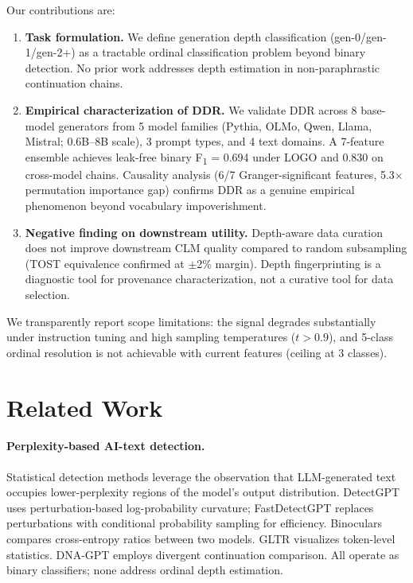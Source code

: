 \documentclass[11pt,a4paper]{article}
\newcommand{\fone}{F\textsubscript{1}}
\begin{document}
Our contributions are:
\begin{enumerate}[leftmargin=*,nosep]
\item \textbf{Task formulation.} We define generation depth classification (gen-0/gen-1/gen-2+) as a tractable ordinal classification problem beyond binary detection. No prior work addresses depth estimation in non-paraphrastic continuation chains.

\item \textbf{Empirical characterization of DDR.} We validate DDR across 8 base-model generators from 5 model families (Pythia, OLMo, Qwen, Llama, Mistral; 0.6B--8B scale), 3 prompt types, and 4 text domains. A 7-feature ensemble achieves leak-free binary \fone{} = 0.694 under LOGO and 0.830 on cross-model chains. Causality analysis (6/7 Granger-significant features, 5.3$\times$ permutation importance gap) confirms DDR as a genuine empirical phenomenon beyond vocabulary impoverishment.

\item \textbf{Negative finding on downstream utility.} Depth-aware data curation does not improve downstream CLM quality compared to random subsampling (TOST equivalence confirmed at $\pm$2\% margin). Depth fingerprinting is a diagnostic tool for provenance characterization, not a curative tool for data selection.
\end{enumerate}

We transparently report scope limitations: the signal degrades substantially under instruction tuning and high sampling temperatures ($t > 0.9$), and 5-class ordinal resolution is not achievable with current features (ceiling at 3 classes).

\section{Related Work}
\label{sec:related}

\paragraph{Perplexity-based AI-text detection.}
Statistical detection methods leverage the observation that LLM-generated text occupies lower-perplexity regions of the model's output distribution.
DetectGPT \citep{mitchell2023detectgpt} uses perturbation-based log-probability curvature;
FastDetectGPT \citep{bao2024fastdetectgpt} replaces perturbations with conditional probability sampling for efficiency.
Binoculars \citep{hans2024binoculars} compares cross-entropy ratios between two models.
GLTR \citep{gehrmann2019gltr} visualizes token-level statistics.
DNA-GPT \citep{yang2024dnagpt} employs divergent continuation comparison.
All operate as binary classifiers; none address ordinal depth estimation.
\end{document}
